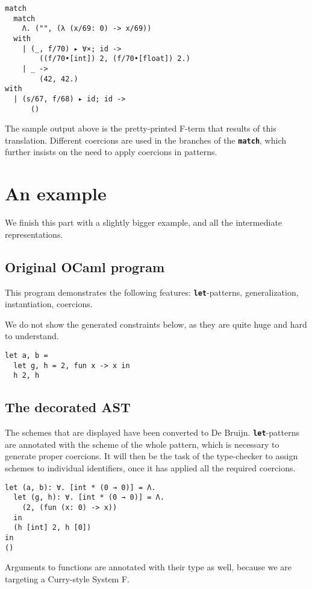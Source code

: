 \documentclass[10pt,a4paper,twoside,titlepage,twocolumn]{article}
\newcommand{\code}[1]{\textbf{\texttt{#1}}}
\begin{document}
\begin{verbatim}
match
  match
    Λ. ("", (λ (x/69: 0) -> x/69))
  with
    | (_, f/70) ▸ ∀×; id ->
        ((f/70•[int]) 2, (f/70•[float]) 2.)
    | _ ->
        (42, 42.)
with
  | (s/67, f/68) ▸ id; id ->
      ()
\end{verbatim}

The sample output above is the pretty-printed F-term that results of this
translation. Different coercions are used in the branches of the \code{match},
which further insists on the need to apply coercions in patterns.

\section{An example}

We finish this part with a slightly bigger example, and all the intermediate
representations.

\subsection{Original OCaml program}

This program demonstrates the following features: \code{let}-patterns,
generalization, instantiation, coercions.

We do not show the generated constraints below, as they are quite huge and hard
to understand.

\begin{verbatim}
let a, b =
  let g, h = 2, fun x -> x in
  h 2, h
\end{verbatim}

\subsection{The decorated AST}

The schemes that are displayed have been converted to De Bruijn.
\code{let}-patterns are annotated with the scheme of the whole pattern, which is
necessary to generate proper coercions. It will then be the task of the
type-checker to assign schemes to individual identifiers, once it has applied
all the required coercions.

\begin{verbatim}
let (a, b): ∀. [int * (0 → 0)] = Λ.
  let (g, h): ∀. [int * (0 → 0)] = Λ.
    (2, (fun (x: 0) -> x))
  in
  (h [int] 2, h [0])
in
()
\end{verbatim}

Arguments to functions are annotated with their type as well, because we are
targeting a Curry-style System F.
\end{document}

